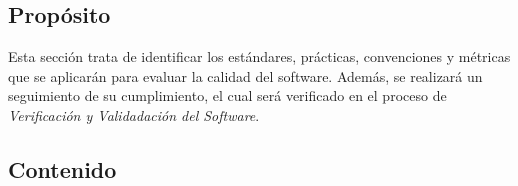 \documentclass[11pt, a4paper, twoside, titlepage]{article}
\begin{document}
		\subsection{Propósito}

			Esta sección trata de identificar los estándares, prácticas, convenciones y métricas que se aplicarán para evaluar la calidad del software. Además, se realizará un seguimiento de su cumplimiento, el cual será verificado en el proceso de \textit{Verificación y Validadación del Software}.

		\subsection{Contenido}
\end{document}
